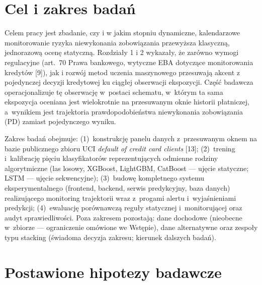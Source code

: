 
\section{Cel i zakres badań}

Celem pracy jest zbadanie, czy i w jakim stopniu dynamiczne, kalendarzowe
monitorowanie ryzyka niewykonania zobowiązania przewyższa klasyczną, jednorazową
ocenę statyczną. Rozdziały 1 i 2 wykazały, że zarówno wymogi regulacyjne (art.~70
Prawa bankowego, wytyczne EBA dotyczące monitorowania kredytów [9]), jak i rozwój
metod uczenia maszynowego przesuwają akcent z pojedynczej decyzji kredytowej ku
ciągłej obserwacji ekspozycji. Część badawcza operacjonalizuje tę obserwację
w~postaci schematu, w~którym ta sama ekspozycja oceniana jest wielokrotnie na
przesuwanym oknie historii płatniczej, a~wynikiem jest trajektoria
prawdopodobieństwa niewykonania zobowiązania (PD) zamiast pojedynczego wyniku.

Zakres badań obejmuje: (1)~konstrukcję panelu danych z~przesuwanym oknem na bazie
publicznego zbioru UCI \emph{default of credit card clients} [13];
(2)~trening i~kalibrację pięciu klasyfikatorów reprezentujących odmienne rodziny
algorytmiczne (las losowy, XGBoost, LightGBM, CatBoost --- ujęcie statyczne;
LSTM --- ujęcie sekwencyjne); (3)~budowę kompletnego systemu eksperymentalnego
(frontend, backend, serwis predykcyjny, baza danych) realizującego monitoring
trajektorii wraz z~progami alertu i~wyjaśnieniami predykcji; (4)~ewaluację
porównawczą reguły statycznej i~monitorującej oraz audyt sprawiedliwości.
Poza zakresem pozostają: dane dochodowe (nieobecne w~zbiorze --- ograniczenie
omówione we Wstępie), dane alternatywne oraz zespoły typu stacking (świadoma
decyzja zakresu; kierunek dalszych badań).

\section{Postawione hipotezy badawcze}

